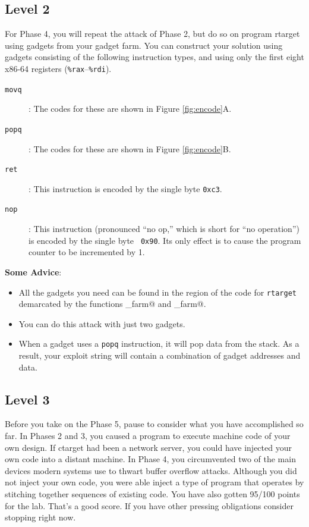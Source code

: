 \documentclass[11pt]{article}
\newcommand{\reg}[1]{\textrm{\texttt{\%#1}}}
\newcommand{\raxreg}{\reg{rax}}
\newcommand{\rdireg}{\reg{rdi}}
\begin{document}
\subsection{Level 2}

For Phase 4, you will repeat the attack of Phase 2, but do so on
program {\sc rtarget} using gadgets from your gadget farm.  You can
construct your solution using gadgets consisting of the following
instruction types, and using only the first eight x86-64 registers
(\raxreg{}--\rdireg{}).
\begin{description}
\item[{\tt movq}]: The codes for these are shown in Figure
  \ref{fig:encode}A. 
\item[{\tt popq}]: The codes for these are shown in Figure
  \ref{fig:encode}B. 
\item[{\tt ret}]: This instruction is encoded by the single byte {\tt 0xc3}.
\item[{\tt nop}]: This instruction (pronounced ``no op,'' which is
  short for ``no operation'')  is encoded by the single byte {\tt
  0x90}.  Its only effect is to cause the program counter to be
  incremented by 1.
\end{description}

{\bf Some Advice}:
\begin{itemize}
\item All the gadgets you need can be found in the region of the
  code for {\tt rtarget} demarcated by the functions \verb@start_farm@ and
  \verb@mid_farm@.
\item You can do this attack with just two gadgets.
\item When a gadget uses a {\tt popq} instruction, it will pop data
  from the stack.  As a result, your exploit string will contain a
  combination of gadget addresses and data.
\end{itemize}

\subsection{Level 3}

Before you take on the Phase 5, pause to consider what you have
accomplished so far.
In Phases 2 and 3,
you caused a program to execute machine code of your
own design.  If {\sc ctarget} had been a network server, you could
have injected your own code into a distant machine.  In Phase 4, you
circumvented two of the main devices modern systems use to thwart
buffer overflow attacks.  Although you did not inject your own code,
you were able inject a type of program that operates by stitching
together sequences of existing code.
You have also gotten 95/100 points for the lab.  That's a good score.
If you have other pressing obligations consider stopping right now.
\end{document}
